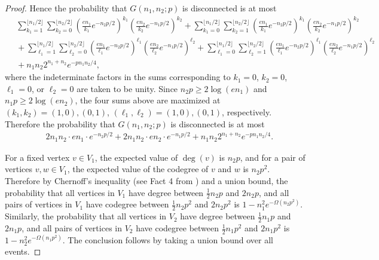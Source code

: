 \begin{proof}
Hence the probability that $G(n_1, n_2;p)$ is disconnected is at most
\begin{align*}
	&\, \sum_{k_1=1}^{\lfloor n_1/2 \rfloor}
	\sum_{k_2=0}^{\lfloor n_2/2 \rfloor}
	\left(\frac{en_1}{k_1} e^{-n_2p/2}\right)^{k_1} 
	\left(\frac{en_2}{k_2} e^{-n_1p/2}\right)^{k_2}
	+
	\sum_{k_1=0}^{\lfloor n_1/2 \rfloor}
	\sum_{k_2=1}^{\lfloor n_2/2 \rfloor}
	\left(\frac{en_1}{k_1} e^{-n_2p/2}\right)^{k_1} 
	\left(\frac{en_2}{k_2} e^{-n_1p/2}\right)^{k_2}
	\\
	&\,+ \sum_{\ell_1=1}^{\lfloor n_1/2 \rfloor}
	\sum_{\ell_2=0}^{\lfloor n_2/2 \rfloor}
	\left(\frac{en_1}{\ell_1} e^{-n_2p/2}\right)^{\ell_1} 
	\left(\frac{en_2}{\ell_2} e^{-n_1p/2}\right)^{\ell_2}
	+
	\sum_{\ell_1=0}^{\lfloor n_1/2 \rfloor}
	\sum_{\ell_2=1}^{\lfloor n_2/2 \rfloor}
	\left(\frac{en_1}{\ell_1} e^{-n_2p/2}\right)^{\ell_1} 
	\left(\frac{en_2}{\ell_2} e^{-n_1p/2}\right)^{\ell_2}
	\\
	&\,+ n_1 n_2 2^{n_1 + n_2} e^{-pn_1n_2/4},
\end{align*}
where the indeterminate factors in the sums corresponding to $k_1=0$, $k_2=0$, $\ell_1=0$, or $\ell_2=0$ are taken to be unity.
Since $n_2 p \ge 2\log (e n_1)$ and $n_1 p \ge 2\log (e n_2)$, the four sums above are maximized
at $(k_1, k_2)=(1,0), (0,1)$, $(\ell_1, \ell_2)=(1,0), (0,1)$, respectively. Therefore
the probability that $G(n_1, n_2;p)$ is disconnected is at most
\begin{align*}
	&\, 
	2n_1 n_2
	\cdot en_1 \cdot e^{-n_2p/2}
	+
	2n_1 n_2
	\cdot en_2 \cdot e^{-n_1p/2}
	+ n_1 n_2 2^{n_1 + n_2} e^{-pn_1n_2/4}. 
\end{align*}

For a fixed vertex $v \in V_1$, the expected value of $\deg(v)$ is $n_2 p$, 
and for a pair of vertices $v,w \in V_1$, the expected value of
the codegree of $v$ and $w$ is $n_2 p^{2}$. Therefore by 
Chernoff's inequality (see Fact 4 from  \cite{AngluinValiant}) and a union bound, 
the probability that all vertices in $V_1$ have degree between $\frac{1}{2}n_2 p$ and $2n_2p$, 
and all pairs of vertices in $V_1$ have codegree between $\frac{1}{2} n_2p^2$ and $2n_2p^2$ is
$1 - n_1^2 e^{-\Omega(n_2p^2)}$.
Similarly, the probability that all vertices in $V_2$ have degree between $\frac{1}{2}n_1 p$ and $2n_1p$, 
and all pairs of vertices in $V_2$ have codegree between $\frac{1}{2} n_1p^2$ and $2n_1p^2$ is
$1 - n_2^2 e^{-\Omega(n_1p^2)}$. The conclusion follows by taking a union bound over
all events.
\end{proof}





